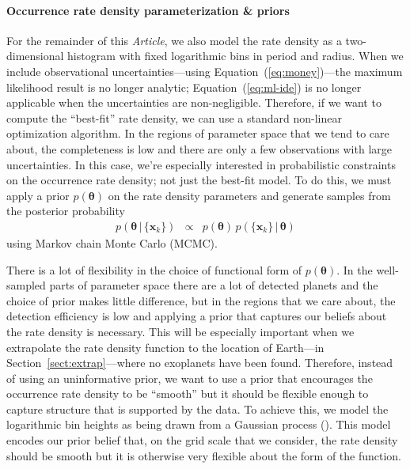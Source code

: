 \documentclass[12pt,preprint]{aastex}
\newcommand{\paper}{\textsl{Article}}
\newcommand{\Eq}[1]{Equation~(\ref{eq:#1})}
\newcommand{\eq}[1]{\Eq{#1}}
\newcommand{\eqlabel}[1]{\label{eq:#1}}
\newcommand{\Sect}[1]{Section~\ref{sect:#1}}
\newcommand{\sect}[1]{\Sect{#1}}
\newcommand{\bvec}[1]{\ensuremath{\boldsymbol{#1}}}
\newcommand{\ratepar}{{\ensuremath{\theta}}}
\newcommand{\ratepars}{{\ensuremath{\bvec{\ratepar}}}}
\newcommand{\data}{{\ensuremath{\bvec{x}}}}
\begin{document}
\paragraph{Occurrence rate density parameterization \& priors}
For the remainder of this \paper, we also model the rate density as a
two-dimensional histogram with fixed logarithmic bins in period and radius.
When we include observational uncertainties---using \eq{money}---the maximum
likelihood result is no longer analytic; \eq{ml-ide} is no longer applicable
when the uncertainties are non-negligible.
Therefore, if we want to compute the ``best-fit'' rate density, we can use a
standard non-linear optimization algorithm.
In the regions of parameter space that we tend to care about, the completeness
is low and there are only a few observations with large uncertainties.
In this case, we're especially interested in probabilistic constraints on the
occurrence rate density; not just the best-fit model.
To do this, we must apply a prior $p(\ratepars)$ on the rate density
parameters and generate samples from the posterior probability
\begin{eqnarray}\eqlabel{posterior}
p(\ratepars\,|\,\{\data_k\}) &\propto&
    p(\ratepars)\,p(\{\data_k\}\,|\,\ratepars)
\end{eqnarray}
using Markov chain Monte Carlo (MCMC).

There is a lot of flexibility in the choice of functional form of
$p(\ratepars)$.
In the well-sampled parts of parameter space there are a lot of
detected planets and the choice of prior makes little difference, but in the
regions that we care about, the detection efficiency is low and applying a
prior that captures our beliefs about the rate density is necessary.
This will be especially important when we extrapolate the rate density
function to the location of Earth---in \sect{extrap}---where no exoplanets
have been found.
Therefore, instead of using an uninformative prior, we want to use a prior
that encourages the occurrence rate density to be ``smooth'' but it should be
flexible enough to capture structure that is supported by the data.
To achieve this, we model the logarithmic bin heights as being drawn from a
Gaussian process (\citealt{gp, gibson-gp, dfm-gp}).
This model encodes our prior belief that, on the grid scale that we consider,
the rate density should be smooth but it is otherwise very flexible about the
form of the function.
\end{document}
